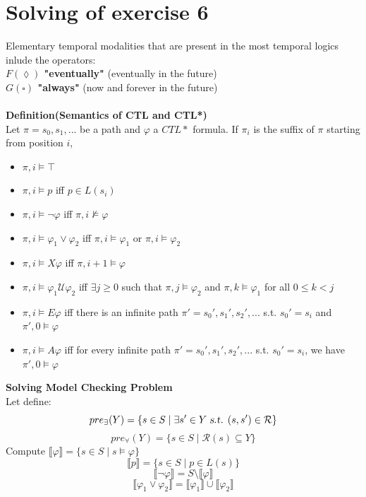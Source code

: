 \documentclass[10pt,a4paper]{article}
\begin{document}
\section{Solving of exercise 6}
Elementary temporal modalities that are present in the most temporal logics inlude the operators:\\
\textbf{$F(\lozenge)$ "eventually"} (eventually in the future)\\
\textbf{$G(\square)$ "always"} (now and forever in the future)\\\\
\textbf{{\large Definition(Semantics of CTL and CTL*)}}\\
Let $\pi=s_0,s_1,...$ be a path and $\varphi$ a $CTL*$ formula. If $\pi_i$ is the suffix of $\pi$ starting from position $i$,
\begin{itemize}
\item $\pi, i \models \top$
\item $\pi, i \models p$ iff $p \in L(s_i)$
\item $\pi, i \models \neg \varphi$ iff $\pi, i \not \models \varphi$
\item $\pi, i \models \varphi_1 \vee \varphi_2$ iff $\pi, i \models \varphi_1$ or $\pi, i \models \varphi_2$
\item $\pi, i \models X\varphi$ iff $\pi, i+1 \models \varphi$
\item $\pi, i \models \varphi_1 \mathcal{U} \varphi_2$ iff $\exists j \geq 0$ such that $\pi, j \models \varphi_2$ and $\pi, k \models \varphi_1$ for all $0 \leq k < j$
\item $\pi, i \models E\varphi$ iff there is an infinite path $\pi'=s_0',s_1',s_2',...$ s.t. $s_0'=s_i$ and $\pi', 0 \models \varphi$
\item $\pi, i \models A\varphi$ iff for every infinite path $\pi'=s_0', s_1', s_2',...$ s.t. $s_0'=s_i$, we have $\pi', 0 \models \varphi$
\end{itemize}
\textbf{{\large Solving Model Checking Problem}}\\
Let define:
\[ pre_\exists(Y) = \{ s \in S \mid \exists s' \in Y \textsl{ s.t. } (s, s') \in \mathcal{R} \} \]
\[ pre_\forall(Y) = \{ s \in S \mid \mathcal{R}(s) \subseteq Y \} \]
Compute $\llbracket \varphi \rrbracket = \{s \in S \mid s \models \varphi \}$
\[ \llbracket p \rrbracket = \{ s \in S \mid p \in L(s) \} \]
\[ \llbracket \neg \varphi \rrbracket = S \setminus \llbracket \varphi \rrbracket \]
\[ \llbracket \varphi_1 \vee \varphi_2 \rrbracket = \llbracket \varphi_1 \rrbracket \cup \llbracket \varphi_2 \rrbracket \]
\end{document}
